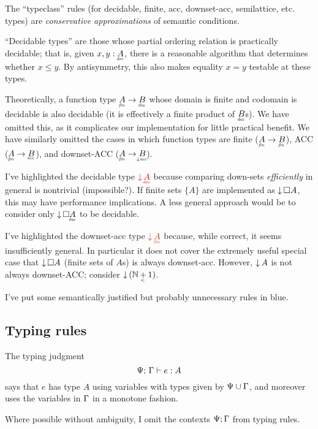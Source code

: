 \documentclass{article}
\begin{document}
The ``typeclass'' rules (for decidable, finite, acc, downset-acc, semilattice,
etc.\! types) are \emph{conservative approximations} of semantic conditions.

``Decidable types'' are those whose partial ordering relation is practically
decidable; that is, given $x, y : \eq{A}$, there is a reasonable algorithm that
determines whether $x \le y$. By antisymmetry, this also makes equality $x = y$
testable at these types.

Theoretically, a function type $\under{fin}{A} \to \eq{B}$ whose domain is
finite and codomain is decidable is also decidable (it is effectively a finite
product of $\eq{B}$s). We have omitted this, as it complicates our
implementation for little practical benefit. We have similarly omitted the cases
in which function types are finite ($\fin{A} \to \fin{B}$), ACC ($\fin{A} \to
\acc{B}$), and downset-ACC ($\fin{A} \to \eltacc{B}$).

I've highlighted the decidable type ${\color{red} \Down{\eq{A}}}$ because
comparing down-sets \emph{efficiently} in general is nontrivial (impossible?).
If finite sets $\{A\}$ are implemented as ${\downarrow}\,{\square{A}}$, this may have
performance implications. A less general approach would be to consider only
$\Down{\Disc{\eq{A}}}$ to be decidable.

I've highlighted the downset-acc type ${\color{Bittersweet} \Down{\fin{A}}}$
because, while correct, it seems insufficiently general. In particular it does
not cover the extremely useful special case that ${\downarrow}\,{\square{A}}$ (finite sets
of $A$s) is always downset-acc. However, ${\downarrow}\,{A}$ is not always downset-ACC;
consider $\Down{(\N \mathop{\under{<}{{+}}} 1)}$. 

I've put some semantically justified but probably unnecessary rules in
{\color{Cerulean} blue}.


\subsection{Typing rules}

The typing judgment \[{\Psi};\,{\Gamma}\vdash {e}:{A}\] says that $e$ has type $A$ using
variables with types given by $\Psi \cup \Gamma$, and moreover uses the variables in
$\Gamma$ in a monotone fashion.

Where possible without ambiguity, I omit the contexts $\Psi;\Gamma$ from typing
rules.
\end{document}

